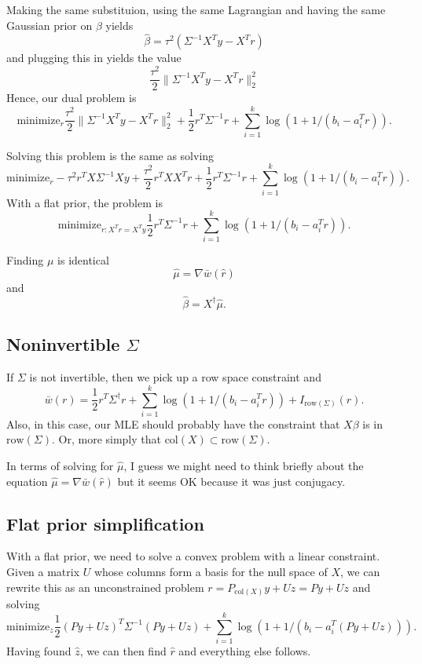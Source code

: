 \documentclass{article}
\begin{document}
Making the same substituion, using the same Lagrangian and having the same Gaussian prior on $\beta$ yields
$$
\hat{\beta} = \tau^2 (\Sigma^{-1} X^Ty-X^Tr)
$$
and plugging this in yields the  value
$$
\frac{\tau^2}{2}\|\Sigma^{-1} X^Ty-X^Tr\|^2_2
$$
Hence, our dual problem is
$$
\text{minimize}_r \frac{\tau^2}{2}\|\Sigma^{-1} X^Ty-X^Tr\|^2_2 + \frac{1}{2}r^T\Sigma^{-1}r +  \sum_{i=1}^k \log(1 + 1 /(b_i - a_i^Tr)).
$$

Solving this problem is the same as solving
$$
\text{minimize}_r -\tau^2 r^TX\Sigma^{-1}Xy + \frac{\tau^2}{2} r^TXX^Tr + \frac{1}{2}r^T\Sigma^{-1}r +  \sum_{i=1}^k \log(1 + 1 /(b_i - a_i^Tr)).
$$
With a flat prior, the problem is
$$
\text{minimize}_{r:X^Tr=X^Ty} \frac{1}{2}r^T\Sigma^{-1}r +  \sum_{i=1}^k \log(1 + 1 /(b_i - a_i^Tr)).
$$

Finding $\mu$ is identical
$$
\hat{\mu} = \nabla \bar{w}(\hat{r})
$$
and
$$
\hat{\beta}=X^{\dagger}\hat{\mu}.
$$

\subsection{Noninvertible $\Sigma$}

If $\Sigma$ is not invertible, then we pick up a row space constraint and
$$
\bar{w}(r) = \frac{1}{2}r^T\Sigma^{\dagger}r +  \sum_{i=1}^k \log(1 + 1 /(b_i - a_i^Tr)) + I_{\text{row}(\Sigma)}(r).
$$
Also, in this case, our MLE should probably have the constraint that $X\beta$ is in $\text{row}(\Sigma)$. Or, more simply that $\text{col}(X) \subset \text{row}(\Sigma)$.

In terms of solving for $\hat{\mu}$, I guess we might need to think briefly about the equation
$
\hat{\mu} = \nabla \bar{w}(\hat{r})$ but it seems OK because it was just conjugacy.

\subsection{Flat prior simplification}

With a flat prior, we need to solve a convex problem with a linear constraint. Given a matrix $U$ whose columns
form a basis for the null space of $X$, we can rewrite this
as an unconstrained problem $r=P_{\text{col}(X)}y + Uz=Py+Uz$ and solving
$$
\text{minimize}_z  \frac{1}{2}(Py+Uz)^T\Sigma^{-1}(Py+Uz) +  \sum_{i=1}^k \log(1 + 1 /(b_i - a_i^T(Py+Uz))).
$$
Having found $\hat{z}$, we can then find $\hat{r}$ and everything else follows.
\end{document}
